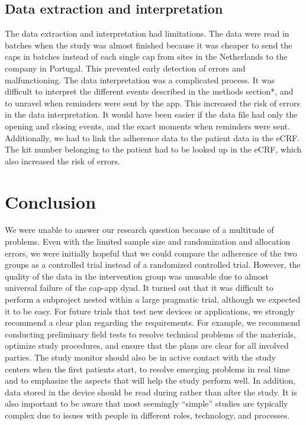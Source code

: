 \documentclass[twocolumn, serif, empirical, authordate]{jote-article}
\begin{document}
\subsection*{Data extraction and interpretation}

 The data extraction and interpretation had limitations. The data were read in batches when the study was almost finished because it was cheaper to send the caps in batches instead of each single cap from sites in the Netherlands to the company in Portugal. This prevented early detection of errors and malfunctioning.
 The data interpretation was a complicated process. It was difficult to interpret the different events described in the methods section*, and to unravel when reminders were sent by the app. This increased the risk of errors in the data interpretation. It would have been easier if the data file had only the opening and closing events, and the exact moments when reminders were sent. Additionally, we had to link the adherence data to the patient data in the eCRF. The kit number belonging to the patient had to be looked up in the eCRF, which also increased the risk of errors.


\section*{Conclusion}

 We were unable to answer our research question because of a multitude of problems. Even with the limited sample size and randomization and allocation errors, we were initially hopeful that we could compare the adherence of the two groups as a controlled trial instead of a randomized controlled trial. However, the quality of the data in the intervention group was unusable due to almost universal failure of the cap-app dyad. It turned out that it was difficult to perform a subproject nested within a large pragmatic trial, although we expected it to be easy.
 For future trials that test new devices or applications, we strongly recommend a clear plan regarding the requirements. For example, we recommend conducting preliminary field tests to resolve technical problems of the materials, optimize study procedures, and ensure that the plans are clear for all involved parties. The study monitor should also be in active contact with the study centers when the first patients start, to resolve emerging problems in real time and to emphasize the aspects that will help the study perform well. In addition, data stored in the device should be read during rather than after the study. It is also important to be aware that most seemingly ``simple'' studies are typically complex due to issues with people in different roles, technology, and processes.
\end{document}
